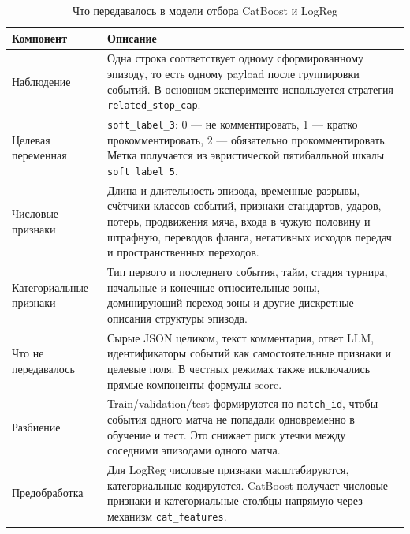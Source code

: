 \begin{table}[H]
\centering
\small
\caption{Что передавалось в модели отбора CatBoost и LogReg}
\label{tab:selector-training-data}
\begin{tabular}{p{}p{}}
\toprule
\textbf{Компонент} & \textbf{Описание} \\
\midrule
Наблюдение & Одна строка соответствует одному сформированному эпизоду, то есть одному payload после группировки событий. В основном эксперименте используется стратегия \texttt{related\_stop\_cap}. \\
Целевая переменная & \texttt{soft\_label\_3}: 0 --- не комментировать, 1 --- кратко прокомментировать, 2 --- обязательно прокомментировать. Метка получается из эвристической пятибалльной шкалы \texttt{soft\_label\_5}. \\
Числовые признаки & Длина и длительность эпизода, временные разрывы, счётчики классов событий, признаки стандартов, ударов, потерь, продвижения мяча, входа в чужую половину и штрафную, переводов фланга, негативных исходов передач и пространственных переходов. \\
Категориальные признаки & Тип первого и последнего события, тайм, стадия турнира, начальные и конечные относительные зоны, доминирующий переход зоны и другие дискретные описания структуры эпизода. \\
Что не передавалось & Сырые JSON целиком, текст комментария, ответ LLM, идентификаторы событий как самостоятельные признаки и целевые поля. В честных режимах также исключались прямые компоненты формулы score. \\
Разбиение & Train/validation/test формируются по \texttt{match\_id}, чтобы события одного матча не попадали одновременно в обучение и тест. Это снижает риск утечки между соседними эпизодами одного матча. \\
Предобработка & Для LogReg числовые признаки масштабируются, категориальные кодируются. CatBoost получает числовые признаки и категориальные столбцы напрямую через механизм \texttt{cat\_features}. \\
\bottomrule
\end{tabular}
\end{table}

